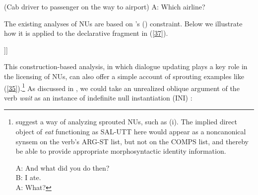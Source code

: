 \documentclass[output=paper
                ,modfonts
                ,nonflat
	        ,collection
	        ,collectionchapter
	        ,collectiontoclongg
 	        ,biblatex
                ,babelshorthands
                ,newtxmath
                ,draftmode
                ,colorlinks, citecolor=brown
]{./langsci/langscibook}
\begin{document}
{\ea (Cab driver to passenger on the way to airport) A: Which airline?\label{40}\z

The existing analyses of NUs \citep{Ginzburg2012, Sag2011, Kim2015, Abeille2014, Abeille2017} are based on \citeauthor{Ginzburg:Sag:2000}'s (\citeyear{Ginzburg:Sag:2000}) constraint. Below we illustrate how it is applied to the declarative fragment in (\ref{37}).

\ea\label{41}
\begin{forest}
[\begin{avm}\avml \hfil S\\
\[CAT &\[HEAD v\]\\
 CTXT & \[MAX-QUD $\lambda$\{$\pi$$^{i}$\}\[{\it break}({\it b,i})\]\\
  SAL-UTT \{\[CAT\ \@2\\
                          CONT & \[IND & {\it i}\\
                                 \] \]\}\]\]  \avmr \end{avm}
[\begin{avm}\avml \hfil NP\\
             \[CAT  \@2\\
  CONT & \[IND & {\it i}%
   \]\]\avmr\end{avm}
 [The mike]]]
\end{forest}
\z

This construction-based analysis, in which dialogue updating plays
a key role in the licensing of NUs, can also offer a simple account of
sprouting examples like (\ref{35}).\footnote{\citet[330]{Ginzburg:Sag:2000} suggest a way of analyzing sprouted NUs, such as (i). The implied direct object of {\it eat} functioning as SAL-UTT here would appear as a noncanonical synsem on the verb's ARG-ST list, but not on the COMPS list, and thereby be able to provide appropriate morphosyntactic identity information.
	
	\ea  A: And what did you do then? \\B: I ate. \\A: What?\z
	
	
} As discussed in \citet{Kim2015}, we could take an unrealized oblique argument of
the verb {\it wait} as an instance of indefinite null instantiation (INI) \citep[see][]{Ruppenhofer2014}:

}
\end{document}

